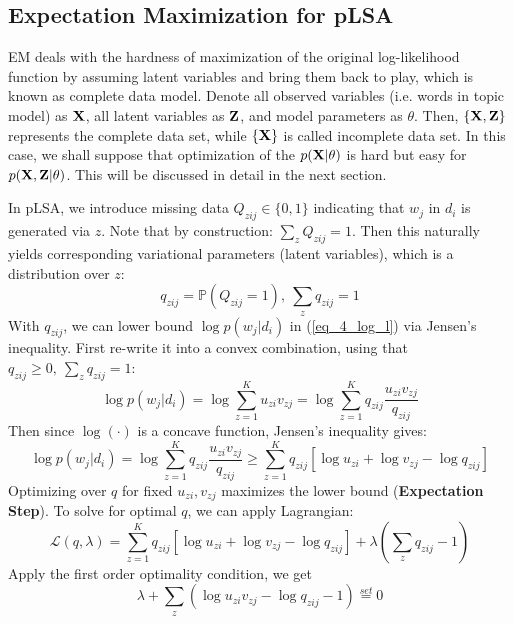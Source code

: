 \documentclass[../book-template.tex]{subfiles}
\begin{document}
\subsection{Expectation Maximization for pLSA}
EM deals with the hardness of maximization of the original log-likelihood function by assuming latent variables and bring them back to play, which is known as complete data model. Denote all observed variables (i.e. words in topic model) as ${\bf X}$, all latent variables as ${\bf Z}$, and model parameters as $\theta$. Then, $\{{\bf X, Z}\}$ represents the complete data set, while $\{{\bf X}\}$ is called incomplete data set. In this case, we shall suppose that optimization of the $p({\bf X}|\theta)$ is hard but easy for $p({\bf X, Z}|\theta)$. This will be discussed in detail in the next section.
\par In pLSA, we introduce missing data $Q_{zij}\in\{0,1\}$ indicating that $w_j$ in $d_i$ is generated via $z$. Note that by construction: $\sum_{z}Q_{zij}=1$. Then this naturally yields corresponding variational parameters (latent variables), which is a distribution over $z$:
\begin{equation*}
	q_{zij}=\mathbb{P}(Q_{zij}=1),\ \sum_{z} q_{zij}=1
\end{equation*}
With $q_{zij}$, we can lower bound $\log p(w_j|d_i)$ in (\ref{eq_4_log_l}) via Jensen's inequality. First re-write it into a convex combination, using that $q_{zij}\geq 0,\ \sum_{z} q_{zij}=1$:
\begin{equation*}
	\log p(w_j|d_i) = \log \sum_{z=1}^{K} u_{zi}v_{zj} =  \log \sum_{z=1}^{K} q_{zij}\frac{u_{zi}v_{zj}}{q_{zij}}
\end{equation*}
Then since $\log(\cdot)$ is a concave function, Jensen's inequality gives:
\begin{equation}\label{eq_4_lwb}
	\log p(w_j|d_i) =\log \sum_{z=1}^{K} q_{zij}\frac{u_{zi}v_{zj}}{q_{zij}} \geq \sum_{z=1}^{K} q_{zij}[\log u_{zi} + \log v_{zj} - \log q_{zij}]
\end{equation}
Optimizing over $q$ for fixed $u_{zi},v_{zj}$ maximizes the lower bound (\textbf{Expectation Step}). To solve for optimal $q$, we can apply Lagrangian:
\begin{equation*}
	\mathcal{L}(q, \lambda) = \sum_{z=1}^{K} q_{zij}[\log u_{zi} + \log v_{zj} - \log q_{zij}] + \lambda (\sum_{z} q_{zij}-1)
\end{equation*}
Apply the first order optimality condition, we get
\begin{equation*}
	\lambda + \sum_{z} (\log u_{zi}v_{zj} - \log q_{zij} -1) \overset{set}{=}0
\end{equation*}
\end{document}
